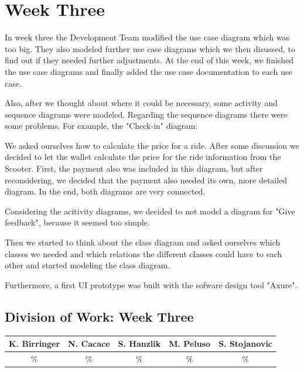 \documentclass[a4paper, 12pt]{article}
\begin{document}
\section{Week Three}
In week three the Development Team modified the use case diagram which was too big. They also modeled further use case diagrams which we then disussed, to find out if they needed further adjustments. At the end of this week, we finished the use case diagrams and finally added the use case documentation to each use case.

Also, after we thought about where it could be necessary, some activity and sequence diagrams were modeled.
Regarding the sequence diagrams there were some problems.
For example, the "Check-in" diagram:

We asked ourselves how to calculate the price for a ride. After some discussion we decided to let the wallet calculate the price for the ride information from the Scooter.
First, the payment also was included in this diagram, but after reconsidering, we decided that the payment also needed its own, more detailed diagram. In the end, both diagrams are very connected.

Considering the acitivity diagrams, we decided to not model a diagram for "Give feedback", because it seemed too simple.

Then we started to think about the class diagram and asked ourselves which classes we needed and which relations the different classes could have to each other and started modeling the class diagram.

Furthermore, a first UI prototype was built with the sofware design tool "Axure".\cite{axure}

\newpage
\subsection{Division of Work: Week Three}

\begin{table}[h]
\centering
\setlength{\tabcolsep}{10pt}
\begin{tabular}{|c|c|c|c|c|}
\hline
K. Birringer & N. Cacace & S. Hanzlik & M. Peluso & S. Stojanovic\\
\hline
\% & \% & \% & \% & \% \\ 
\hline
\end{tabular}
\end{table}

\end{document}
